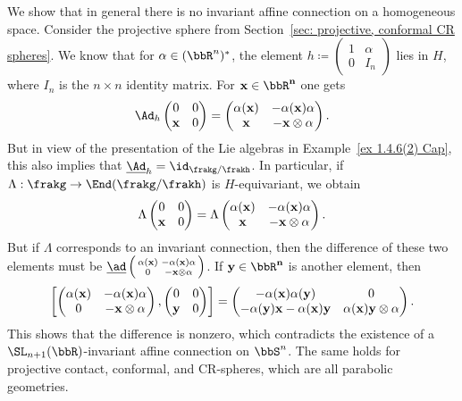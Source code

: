 \begin{example}
    We show that in general there is no invariant affine connection on a homogeneous space. Consider the projective sphere from Section~\ref{sec: projective, conformal CR spheres}. We know that for $\alpha\in (\bbR^n)^\ast$, the element $h\coloneqq \left(\begin{smallmatrix}
        1&\alpha \\ 0& I_n
    \end{smallmatrix}\right)$
    lies in $H$, where $I_n$ is the $n\times n$ identity matrix. For $\bf{x}\in\bbR^n$ one gets 
    \[\Ad_h \begin{pmatrix}
        0&0\\ \bf{x}&0
    \end{pmatrix}=
    \begin{pmatrix}
        \alpha(\bf{x})&-\alpha(\bf{x})\alpha\\
        \bf{x}&-\bf{x}\otimes\alpha 
    \end{pmatrix}.
    \]
    But in view of the presentation of the Lie algebras in Example~\ref{ex 1.4.6(2) Cap}, this also implies that $\underline{\Ad}_h=\id_{\frakg\slash\frakh}$. In particular, if $\Lambda:\frakg\to \End(\frakg\slash\frakh)$ is $H$-equivariant, we obtain 
    \[\Lambda \begin{pmatrix}
        0&0\\\bf{x}&0
    \end{pmatrix}=
    \Lambda \begin{pmatrix}
        \alpha(\bf{x})&-\alpha(\bf{x})\alpha\\
        \bf{x}&-\bf{x}\otimes\alpha 
    \end{pmatrix}.\]
    But if $\Lambda$ corresponds to an invariant connection, then the difference of these two elements must be $\underline{\ad}\left(\begin{smallmatrix}
        \alpha(\bf{x})&-\alpha(\bf{x})\alpha\\
        0& -\bf{x}\otimes\alpha
    \end{smallmatrix}\right)$. If $\bf{y}\in\bbR^n$ is another element, then 
    \[\left[
    \begin{pmatrix}
        \alpha(\bf{x})&-\alpha(\bf{x})\alpha\\
        0& -\bf{x}\otimes\alpha
    \end{pmatrix},
    \begin{pmatrix}
        0&0\\\bf{y}&0
    \end{pmatrix}
    \right]=
    \begin{pmatrix}
        -\alpha(\bf{x})\alpha(\bf{y})&0\\
        -\alpha(\bf{y})\bf{x}-\alpha(\bf{x})\bf{y}&\alpha(\bf{x})\bf{y}\otimes\alpha
    \end{pmatrix}.
    \]
    This shows that the difference is nonzero, which contradicts the existence of a $\SL_{n+1}(\bbR)$-invariant affine connection on $\bbS^n$. The same holds for projective contact, conformal, and CR-spheres, which are all parabolic geometries.
\end{example}



